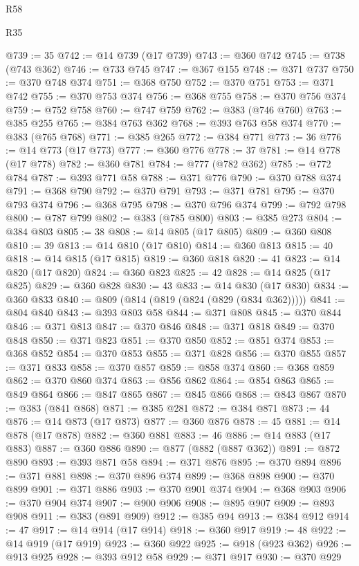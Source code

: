 \begin{lexlean}{R58}
\begin{lexlean}{R35}
\begin{coremodule}
{{{{{{{{{{{{{{{{{{{{{{{{{{{{{{{{{{{{{{{{{{{{{{{{{{{{@739 := 35
@742 := @14 @739 (@17 @739)
@743 := @360 @742
@745 := @738 (@743 @362)
@746 := @733 @745
@747 := @367 @155
@748 := @371 @737
@750 := @370 @748 @374
@751 := @368 @750
@752 := @370 @751
@753 := @371 @742
@755 := @370 @753 @374
@756 := @368 @755
@758 := @370 @756 @374
@759 := @752 @758
@760 := @747 @759
@762 := @383 (@746 @760)
@763 := @385 @255
@765 := @384 @763 @362
@768 := @393 @763 @58 @374
@770 := @383 (@765 @768)
@771 := @385 @265
@772 := @384 @771
@773 := 36
@776 := @14 @773 (@17 @773)
@777 := @360 @776
@778 := 37
@781 := @14 @778 (@17 @778)
@782 := @360 @781
@784 := @777 (@782 @362)
@785 := @772 @784
@787 := @393 @771 @58
@788 := @371 @776
@790 := @370 @788 @374
@791 := @368 @790
@792 := @370 @791
@793 := @371 @781
@795 := @370 @793 @374
@796 := @368 @795
@798 := @370 @796 @374
@799 := @792 @798
@800 := @787 @799
@802 := @383 (@785 @800)
@803 := @385 @273
@804 := @384 @803
@805 := 38
@808 := @14 @805 (@17 @805)
@809 := @360 @808
@810 := 39
@813 := @14 @810 (@17 @810)
@814 := @360 @813
@815 := 40
@818 := @14 @815 (@17 @815)
@819 := @360 @818
@820 := 41
@823 := @14 @820 (@17 @820)
@824 := @360 @823
@825 := 42
@828 := @14 @825 (@17 @825)
@829 := @360 @828
@830 := 43
@833 := @14 @830 (@17 @830)
@834 := @360 @833
@840 := @809 (@814 (@819 (@824 (@829 (@834 @362)))))
@841 := @804 @840
@843 := @393 @803 @58
@844 := @371 @808
@845 := @370 @844
@846 := @371 @813
@847 := @370 @846
@848 := @371 @818
@849 := @370 @848
@850 := @371 @823
@851 := @370 @850
@852 := @851 @374
@853 := @368 @852
@854 := @370 @853
@855 := @371 @828
@856 := @370 @855
@857 := @371 @833
@858 := @370 @857
@859 := @858 @374
@860 := @368 @859
@862 := @370 @860 @374
@863 := @856 @862
@864 := @854 @863
@865 := @849 @864
@866 := @847 @865
@867 := @845 @866
@868 := @843 @867
@870 := @383 (@841 @868)
@871 := @385 @281
@872 := @384 @871
@873 := 44
@876 := @14 @873 (@17 @873)
@877 := @360 @876
@878 := 45
@881 := @14 @878 (@17 @878)
@882 := @360 @881
@883 := 46
@886 := @14 @883 (@17 @883)
@887 := @360 @886
@890 := @877 (@882 (@887 @362))
@891 := @872 @890
@893 := @393 @871 @58
@894 := @371 @876
@895 := @370 @894
@896 := @371 @881
@898 := @370 @896 @374
@899 := @368 @898
@900 := @370 @899
@901 := @371 @886
@903 := @370 @901 @374
@904 := @368 @903
@906 := @370 @904 @374
@907 := @900 @906
@908 := @895 @907
@909 := @893 @908
@911 := @383 (@891 @909)
@912 := @385 @94
@913 := @384 @912
@914 := 47
@917 := @14 @914 (@17 @914)
@918 := @360 @917
@919 := 48
@922 := @14 @919 (@17 @919)
@923 := @360 @922
@925 := @918 (@923 @362)
@926 := @913 @925
@928 := @393 @912 @58
@929 := @371 @917
@930 := @370 @929
}}}}}}}}}}}}}}}}}}}}}}}}}}}}}}}}}}}}}}}}}}}}}}}}}}}}
\end{coremodule}
\end{lexlean}
\end{lexlean}
